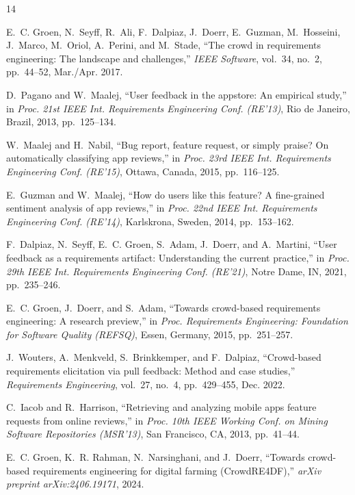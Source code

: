 \documentclass[conference]{IEEEtran}
\begin{document}
\begin{thebibliography}{14}

E.~C. Groen, N.~Seyff, R.~Ali, F.~Dalpiaz, J.~Doerr, E.~Guzman,
M.~Hosseini, J.~Marco, M.~Oriol, A.~Perini, and M.~Stade,
``The crowd in requirements engineering: The landscape and challenges,''
\textit{IEEE Software}, vol.~34, no.~2, pp.~44--52, Mar./Apr. 2017.

D.~Pagano and W.~Maalej,
``User feedback in the appstore: An empirical study,''
in \textit{Proc. 21st IEEE Int. Requirements Engineering Conf. (RE'13)},
Rio de Janeiro, Brazil, 2013, pp.~125--134.

W.~Maalej and H.~Nabil,
``Bug report, feature request, or simply praise? On automatically classifying app reviews,''
in \textit{Proc. 23rd IEEE Int. Requirements Engineering Conf. (RE'15)},
Ottawa, Canada, 2015, pp.~116--125.

E.~Guzman and W.~Maalej,
``How do users like this feature? A fine-grained sentiment analysis of app reviews,''
in \textit{Proc. 22nd IEEE Int. Requirements Engineering Conf. (RE'14)},
Karlskrona, Sweden, 2014, pp.~153--162.

F.~Dalpiaz, N.~Seyff, E.~C. Groen, S.~Adam, J.~Doerr, and A.~Martini,
``User feedback as a requirements artifact: Understanding the current practice,''
in \textit{Proc. 29th IEEE Int. Requirements Engineering Conf. (RE'21)},
Notre Dame, IN, 2021, pp.~235--246.

E.~C. Groen, J.~Doerr, and S.~Adam,
``Towards crowd-based requirements engineering: A research preview,''
in \textit{Proc. Requirements Engineering: Foundation for Software Quality (REFSQ)},
Essen, Germany, 2015, pp.~251--257.

J.~Wouters, A.~Menkveld, S.~Brinkkemper, and F.~Dalpiaz,
``Crowd-based requirements elicitation via pull feedback: Method and case studies,''
\textit{Requirements Engineering}, vol.~27, no.~4, pp.~429--455, Dec. 2022.

C.~Iacob and R.~Harrison,
``Retrieving and analyzing mobile apps feature requests from online reviews,''
in \textit{Proc. 10th IEEE Working Conf. on Mining Software Repositories (MSR'13)},
San Francisco, CA, 2013, pp.~41--44.

E.~C. Groen, K.~R. Rahman, N.~Narsinghani, and J.~Doerr,
``Towards crowd-based requirements engineering for digital farming (CrowdRE4DF),''
\textit{arXiv preprint arXiv:2406.19171}, 2024.


\end{thebibliography}
\end{document}
